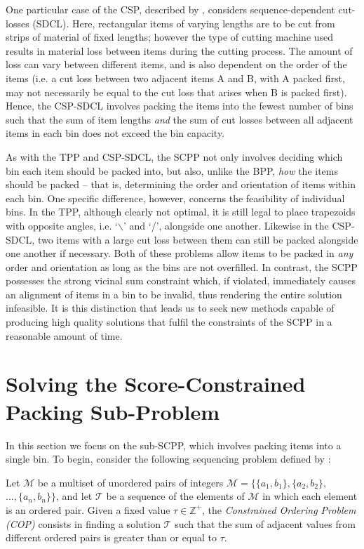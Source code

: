 \documentclass[a4paper,11pt,authoryear]{elsarticle}
\begin{document}
One particular case of the CSP, described by \cite{garraffa2016}, considers sequence-dependent cut-losses (SDCL). Here, rectangular items of varying lengths are to be cut from strips of material of fixed lengths; however the type of cutting machine used results in material loss between items during the cutting process. The amount of loss can vary between different items, and is also dependent on the order of the items (i.e. a cut loss between two adjacent items A and B, with A packed first, may not necessarily be equal to the cut loss that arises when B is packed first). Hence, the CSP-SDCL involves packing the items into the fewest number of bins such that the sum of item lengths \emph{and} the sum of cut losses between all adjacent items in each bin does not exceed the bin capacity.

As with the TPP and CSP-SDCL, the SCPP not only involves deciding which bin each item should be packed into, but also, unlike the BPP, \emph{how} the items should be packed -- that is, determining the order and orientation of items within each bin. One specific difference, however, concerns the feasibility of individual bins. In the TPP, although clearly not optimal, it is still legal to place trapezoids with opposite angles, i.e. `$\backslash$' and `/', alongside one another. Likewise in the CSP-SDCL, two items with a large cut loss between them can still be packed alongside one another if necessary. Both of these problems allow items to be packed in \emph{any} order and orientation as long as the bins are not overfilled. In contrast, the SCPP possesses the strong vicinal sum constraint which, if violated, immediately causes an alignment of items in a bin to be invalid, thus rendering the entire solution infeasible. It is this distinction that leads us to seek new methods capable of producing high quality solutions that fulfil the constraints of the SCPP in a reasonable amount of time.

\section{Solving the Score-Constrained Packing Sub-Problem}
\label{sec:ahc}

\noindent In this section we focus on the sub-SCPP, which involves packing items into a single bin. To begin, consider the following sequencing problem defined by \cite{hawa2018}:

\begin{definition} %
	Let $\mathcal{M}$ be a multiset of unordered pairs of integers $\mathcal{M} = \{\{a_1, b_1\}, \{a_2, b_2\},$ $\dotsc,\{a_n, b_n\}\}$, and let $\mathcal{T}$ be a sequence of the elements of $\mathcal{M}$ in which each element is an ordered pair. Given a fixed value $\tau \in \mathbb{Z}^+$, the \emph{Constrained Ordering Problem (COP)} consists in finding a solution $\mathcal{T}$ such that the sum of adjacent values from different ordered pairs is greater than or equal to $\tau$.
	\label{defn:cop}
\end{definition}
\end{document}
